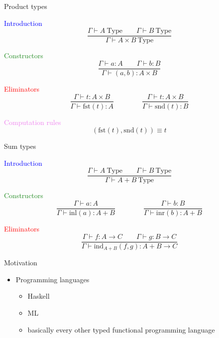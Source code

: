 \documentclass[usenames,dvipsnames]{beamer}
\newcommand{\blu}[1]{\textcolor{blue}{#1}}
\newcommand{\gre}[1]{\textcolor{ForestGreen}{#1}}
\newcommand{\red}[1]{\textcolor{red}{#1}}
\newcommand{\yel}[1]{\textcolor{violet}{#1}}
\begin{document}
    \begin{frame}{Product types}
        \begin{block}{\blu{Introduction}}
            $$\frac{\Gamma \vdash A\ \text{Type}\qquad \Gamma \vdash B\ \text{Type} }{\Gamma \vdash A \times B\ \text{Type}}$$
        \end{block}
        
        \begin{block}{\gre{Constructors}}
            $$\frac{\Gamma \vdash a : A\qquad \Gamma \vdash b : B}{\Gamma\vdash (a,b) : A\times B}$$
        \end{block}
        
        \begin{block}{\red{Eliminators}}
            $$\frac{\Gamma \vdash t : A \times B}{\Gamma\vdash\text{fst}(t) : A} \qquad\qquad
              \frac{\Gamma \vdash t : A \times B}{\Gamma\vdash\text{snd}(t) : B}$$
        \end{block}
        
        \begin{block}{\yel{Computation rules}}
            $$(\text{fst}(t), \text{snd}(t)) \equiv t$$
        \end{block}
    \end{frame}    
    
    \begin{frame}{Sum types}
        \begin{block}{\blu{Introduction}}
            $$\frac{\Gamma \vdash A\ \text{Type}\qquad \Gamma \vdash B\ \text{Type} }{\Gamma \vdash A + B\ \text{Type}}$$
        \end{block}
        
        \begin{block}{\gre{Constructors}}
            $$\frac{\Gamma \vdash a : A}{\Gamma \vdash \text{inl}(a) : A + B} \qquad\qquad
              \frac{\Gamma \vdash b : B}{\Gamma \vdash \text{inr}(b) : A + B}$$
        \end{block}
        
        \begin{block}{\red{Eliminators}}
            $$\frac
                {\Gamma \vdash f : A \to C \qquad \Gamma \vdash g : B \to C}
                {\Gamma \vdash \text{ind}_{A+B}(f, g) : A + B \to C}$$
        \end{block}
        
    \end{frame}
    
    \begin{frame}{Motivation}
        \begin{itemize}
            \item Programming languages
            \begin{itemize}
                \item Haskell
                \item ML
                \item basically every other typed functional programming language
            \end{itemize}
        \end{itemize}
    \end{frame}
    
\end{document}
